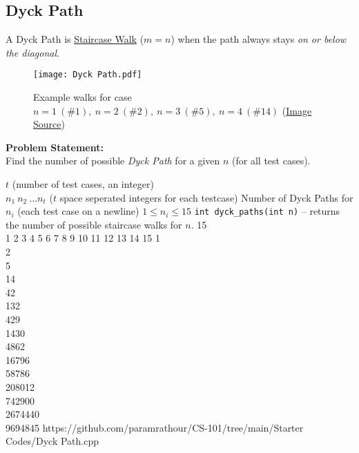 \subsection{Dyck Path}{\label{pp:dyckpath}}
A Dyck Path is \hyperref[pp:staircasewalk]{Staircase Walk} ($m=n$) when the path always stays \emph{on or below the diagonal}.
\begin{figure}[H]
	\centering
	\texttt{[image: Dyck Path.pdf]}
	\caption{Example walks for case $n=1\ (\#1),\ n=2\ (\#2),\ n=3\ (\#5), \ n=4\ (\#14)$ (\href{https://mathworld.wolfram.com/DyckPath.html}{Image Source})}
	\label{fig:dyckpath}
\end{figure}
\vspace{-1em}
\textbf{Problem Statement:}\\
Find the number of possible \emph{Dyck Path} for a given $n$ (for all test cases).
\begin{testcasesFunction}
	{$t$ \hfill(number of test cases, an integer)\\
	$n_1\ n_2\ \ldots n_t$ \hfill($t$ space seperated integers for each testcase)}
	{Number of Dyck Paths for $n_i$  \hfill(each test case on a newline)}
	{$1 \leq n_i \leq 15$}
	{\texttt{int dyck\_paths(int n)} -- returns the number of possible staircase walks for $n$.}
	{15\\1 2 3 4 5 6 7 8 9 10 11 12 13 14 15}
	{1\\2\\5\\14\\42\\132\\429\\1430\\4862\\16796\\58786\\208012\\742900\\2674440\\9694845}
	{https://github.com/paramrathour/CS-101/tree/main/Starter Codes/Dyck Path.cpp}
\end{testcasesFunction}